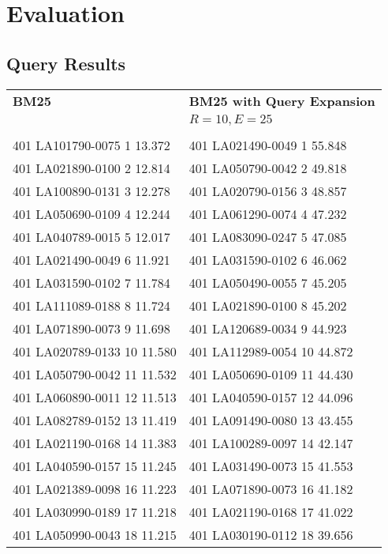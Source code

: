 
\section{Evaluation}
\label{sec:evaluation}

\setlength{\tabcolsep}{15pt}

\subsection{Query Results}

\begin{tabular}{ l l }
\textbf{BM25} & \textbf{BM25 with Query Expansion}\\
              & $R = 10, E = 25$\\\\
401 LA101790-0075 1 13.372 & 401 LA021490-0049 1 55.848\\
401 LA021890-0100 2 12.814 & 401 LA050790-0042 2 49.818\\
401 LA100890-0131 3 12.278 & 401 LA020790-0156 3 48.857\\
401 LA050690-0109 4 12.244 & 401 LA061290-0074 4 47.232\\
401 LA040789-0015 5 12.017 & 401 LA083090-0247 5 47.085\\
401 LA021490-0049 6 11.921 & 401 LA031590-0102 6 46.062\\
401 LA031590-0102 7 11.784 & 401 LA050490-0055 7 45.205\\
401 LA111089-0188 8 11.724 & 401 LA021890-0100 8 45.202\\
401 LA071890-0073 9 11.698 & 401 LA120689-0034 9 44.923\\
401 LA020789-0133 10 11.580 & 401 LA112989-0054 10 44.872\\
401 LA050790-0042 11 11.532 & 401 LA050690-0109 11 44.430\\
401 LA060890-0011 12 11.513 & 401 LA040590-0157 12 44.096\\
401 LA082789-0152 13 11.419 & 401 LA091490-0080 13 43.455\\
401 LA021190-0168 14 11.383 & 401 LA100289-0097 14 42.147\\
401 LA040590-0157 15 11.245 & 401 LA031490-0073 15 41.553\\
401 LA021389-0098 16 11.223 & 401 LA071890-0073 16 41.182\\
401 LA030990-0189 17 11.218 & 401 LA021190-0168 17 41.022\\
401 LA050990-0043 18 11.215 & 401 LA030190-0112 18 39.656\\

\end{tabular}
